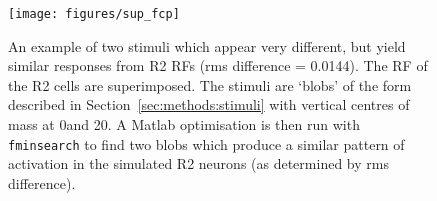 \begin{figure}
\centering
\texttt{[image: figures/sup\_fcp]}
\caption{An example of two stimuli which appear very different, but yield similar responses from R2 \acp{RF} (\ac{rms} difference = 0.0144). The \ac{RF} of the R2 cells are superimposed. The stimuli are `blobs' of the form described in Section~\ref{sec:methods:stimuli} with vertical centres of mass at 0\degree and 20\degree. A Matlab optimisation is then run with \texttt{fminsearch} to find two blobs which produce a similar pattern of activation in the simulated R2 neurons (as determined by \ac{rms} difference).}

\label{supfig:fcp}
\end{figure}
